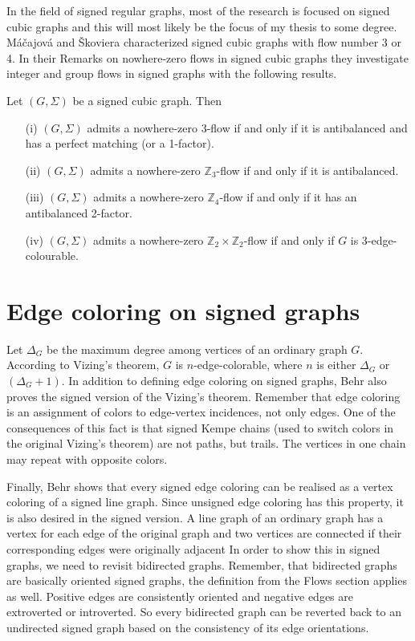 In the field of signed regular graphs, most of the research is focused on signed cubic graphs and this will most likely be 
the focus of my thesis to some degree. Máčajová and Škoviera
characterized signed cubic graphs with flow number 3 or 4. In their Remarks on nowhere-zero flows in signed cubic graphs\cite{cubic-signed-graphs}
they investigate integer and group flows in signed graphs with the following results.

\begin{theorem}
    Let $(G, \Sigma)$ be a signed cubic graph. Then

    \begin{enumerate}
        \item [(i)] $(G, \Sigma)$ admits a nowhere-zero 3-flow if and only if it is antibalanced and has a perfect matching (or a 1-factor).
        \item [(ii)] $(G, \Sigma)$ admits a nowhere-zero $\mathbb{Z}_3$-flow if and only if it is antibalanced.
        \item [(iii)] $(G, \Sigma)$ admits a nowhere-zero $\mathbb{Z}_4$-flow if and only if it has an antibalanced 2-factor.
        \item [(iv)] $(G, \Sigma)$ admits a nowhere-zero $\mathbb{Z}_2 \times \mathbb{Z}_2$-flow if and only if $G$ is 3-edge-colourable. 
    \end{enumerate}
\end{theorem}

\section{Edge coloring on signed graphs}

Let $\Delta _G$ be the maximum degree among vertices of an ordinary graph $G$. According to Vizing's theorem, $G$ is $n$-edge-colorable, where $n$ is either $\Delta _G$
or $(\Delta _G + 1)$. In addition to defining edge coloring on signed graphs, Behr also proves the signed version of the Vizing's theorem.
Remember that edge coloring is an assignment of colors to edge-vertex incidences, not only edges. One of the consequences of this fact
is that signed Kempe chains (used to switch colors in the original Vizing's theorem) are not paths, but trails. The vertices in one chain may 
repeat with opposite colors. 

Finally, Behr shows that every signed edge coloring can be realised as a vertex coloring of a signed line graph.
Since unsigned edge coloring has this property, it is also desired in the signed version. 
A line graph of an ordinary graph has a vertex for each edge of the original graph and two vertices are connected if their corresponding edges were originally adjacent
In order to show this in signed graphs, we need to revisit bidirected graphs. Remember, that bidirected graphs are basically oriented signed graphs, the definition from the Flows section applies as well.
Positive edges are consistently oriented and negative edges are extroverted or introverted.
So every bidirected graph can be reverted back to an undirected signed graph based on the consistency of its edge orientations.

